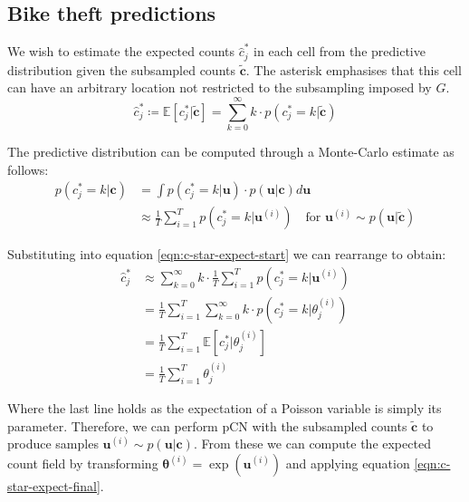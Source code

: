\documentclass[]{article}
\newcommand{\Expect}{\mathbb{E}}
\newcommand{\cbold}{\boldsymbol{c}}
\newcommand{\ubold}{\boldsymbol{u}}
\newcommand{\thetabold}{\boldsymbol{\theta}}
\begin{document}
\subsection{Bike theft predictions}

We wish to estimate the expected counts $\hat{c}^*_j$ in each cell from the predictive distribution given the subsampled counts $\tilde{\cbold}$. The asterisk emphasises that this cell can have an arbitrary location not restricted to the subsampling imposed by $G$.
%
\begin{equation}
	\hat{c}^*_j \coloneqq \Expect \left[ c^*_j | \tilde{\cbold} \right] = \sum_{k=0}^{\infty} k \cdot p(c_j^* = k | \tilde{\cbold})
	\label{eqn:c-star-expect-start}
\end{equation}

The predictive distribution can be computed through a Monte-Carlo estimate as follows:
%
\begin{align}
	p(c_j^* = k | \cbold) &= \int p(c_j^* = k | \ubold) \cdot p(\ubold | \cbold) d\ubold \nonumber \\
	&\approx \frac{1}{T} \sum_{i=1}^{T} p(c_j^* = k | \ubold^{(i)}) \quad \textrm{for } \ubold^{(i)} \sim p(\ubold | \tilde{\cbold})
\end{align}

Substituting into equation \ref{eqn:c-star-expect-start} we can rearrange to obtain:
%
\begin{align}
	\hat{c}^*_j &\approx \sum_{k=0}^{\infty} k \cdot \frac{1}{T} \sum_{i=1}^{T} p(c_j^* = k | \ubold^{(i)}) \nonumber \\
	&= \frac{1}{T} \sum_{i=1}^{T} \sum_{k=0}^{\infty} k \cdot p(c^*_j = k | \theta^{(i)}_j) \nonumber \\
	&= \frac{1}{T} \sum_{i=1}^{T} \Expect \left[ c_j^* | \theta_j^{(i)} \right] \nonumber \\
	&= \frac{1}{T} \sum_{i=1}^{T} \theta_j^{(i)} \label{eqn:c-star-expect-final}
\end{align}

Where the last line holds as the expectation of a Poisson variable is simply its parameter. Therefore, we can perform pCN with the subsampled counts $\tilde{\cbold}$ to produce samples $\ubold^{(i)} \sim p(\ubold | \cbold)$. From these we can compute the expected count field by transforming $\thetabold^{(i)} = \exp (\ubold^{(i)})$ and applying equation \ref{eqn:c-star-expect-final}.
\end{document}
